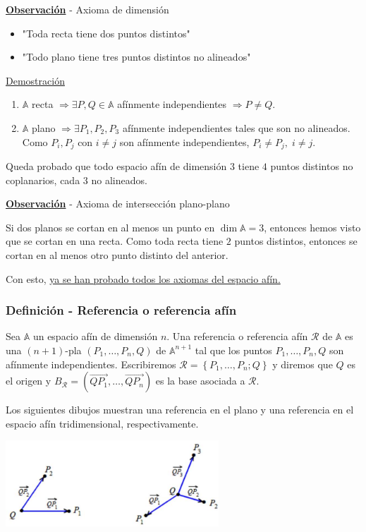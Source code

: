 \documentclass[12pt, a4paper, ones, notitlepage, openany,titlepage]{article}
\newcommand{\demostracion}{\noindent\underline{Demostración}}
\newcommand{\observacion}{\noindent\underline{\textbf{Observación}}}
\begin{document}
\observacion \; - Axioma de dimensión
\begin{itemize}
	\item "Toda recta tiene dos puntos distintos"
	\item "Todo plano tiene tres puntos distintos no alineados"
\end{itemize}
\demostracion
\begin{enumerate}
	\item $\mathbb{A}$ recta $\Longrightarrow \exists P,Q \in \mathbb{A}$ afínmente independientes $\Longrightarrow P \neq Q$.
	\item $\mathbb{A}$ plano $\Longrightarrow \exists P_1, P_2, P_3$ afínmente independientes tales que son no alineados. Como $P_i, P_j$ con $i \neq j$ son afínmente independientes, $P_i \neq P_j, \; i \neq j$.
\end{enumerate}
Queda probado que todo espacio afín de dimensión $3$ tiene $4$ puntos distintos no coplanarios, cada $3$ no alineados.

\observacion \; - Axioma de intersección plano-plano

Si dos planos se cortan en al menos un punto en $\dim \mathbb{A} = 3$, entonces hemos visto que se cortan en una recta. Como toda recta tiene $2$ puntos distintos, entonces se cortan en al menos otro punto distinto del anterior.

\noindent Con esto, \underline{ya se han probado todos los axiomas del espacio afín.}

\subsubsection{Definición - Referencia o referencia afín}
Sea $\mathbb{A}$ un espacio afín de dimensión $n$. Una referencia o referencia afín $\mathcal{R}$ de $\mathbb{A}$ es una $(n+1)$-pla $\left(P_{1}, \ldots, P_{n}, Q\right)$ de $\mathbb{A}^{n+1}$ tal que los puntos $P_{1}, \ldots, P_{n}, Q$ son afínmente independientes. Escribiremos $\mathcal{R}=\left\{P_{1}, \ldots, P_{n} ; Q\right\}$ y diremos que $Q$ es el origen y $B_{\mathcal{R}}=\left(\overrightarrow{Q P_{1}}, \ldots, \overrightarrow{Q P_{n}}\right)$ es la base asociada a $\mathcal{R}$.

Los siguientes dibujos muestran una referencia en el plano y una referencia en el espacio afín tridimensional, respectivamente.

\includegraphics[max width=8cm, center]{2023_03_01_7659aec5e35f9a9b2d3cg-11}
\end{document}
